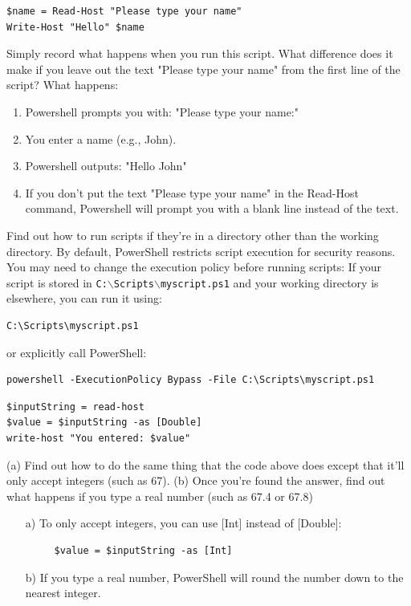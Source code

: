 \documentclass[a4paper]{article}
\begin{document}
\begin{verbatim}
$name = Read-Host "Please type your name"
Write-Host "Hello" $name
\end{verbatim}
\textcolor{green!50!black}{
    Simply record what happens when you run this script. What difference
    does it make if you leave out the text "Please type your name" from the first line of
    the script?
} 
\noindent
What happens: 
\begin{enumerate}
    \item Powershell prompts you with: "Please type your name:"
    \item You enter a name (e.g., John).
    \item Powershell outputs: "Hello John"
    \item If you don't put the text "Please type your name" in the Read-Host command, Powershell will prompt you with a blank line instead of the text.
\end{enumerate}
\textcolor{green!50!black}{
    Find out how to run scripts if they’re in a directory other than the
    working directory.
}
By default, PowerShell restricts script execution for security reasons. You may need to change the execution policy before running scripts:
If your script is stored in \texttt{C:$\backslash$Scripts$\backslash$myscript.ps1} and your working directory is elsewhere, you can run it using:
\begin{verbatim}
C:\Scripts\myscript.ps1
\end{verbatim}
or explicitly call PowerShell:
\begin{verbatim}
powershell -ExecutionPolicy Bypass -File C:\Scripts\myscript.ps1
\end{verbatim}
\begin{verbatim}
$inputString = read-host
$value = $inputString -as [Double]
write-host "You entered: $value"
\end{verbatim}
\textcolor{green!50!black}{
    (a) Find out how to do the same thing that the code above does except
    that it’ll only accept integers (such as 67). (b) Once you’re found the answer, find out
    what happens if you type a real number (such as 67.4 or 67.8)}
\begin{itemize}
    \item[a)] To only accept integers, you can use [Int] instead of [Double]:
     \begin{verbatim}
     $value = $inputString -as [Int]
    \end{verbatim}
    \item[b)] If you type a real number, PowerShell will round the number down to the nearest integer.
\end{itemize}
\end{document}
